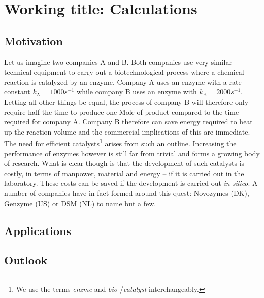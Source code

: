 
\chapter[Working title: Calculations]
{Working title: Calculations\label{ch1}}




\section{Motivation}\label{sec:mot}

Let us imagine two companies A and B.
Both companies use very similar technical equipment to carry out a biotechnological process where a chemical reaction is catalyzed by an enzyme.
Company A uses an enzyme with a rate constant $k_\text{A} = 1000s^{-1}$ while company B uses an enzyme with $k_\text{B} = 2000s^{-1}$.
Letting all other things be equal, the process of company B will therefore only require half the time to produce one Mole of product compared to the time required for company A.
Company B therefore can save energy required to heat up the reaction volume and the commercial implications of this are immediate.
The need for efficient catalysts\footnote{We use the terms \textit{enzme} and \textit{bio-}/\textit{catalyst} interchangeably.} arises from such an outline.
Increasing the performance of enzymes however is still far from trivial and forms a growing body of research.
What is clear though is that the development of such catalysts is costly, in terms of manpower, material and energy -- if it is carried out in the laboratory.
These costs can be saved if the development is carried out \textit{in silico}.
A number of companies have in fact formed around this quest: Novozymes (DK), Genzyme (US) or DSM (NL) to name but a few\citep{meyer2013use}.






\section{Applications}\label{sec:apps}

\section{Outlook}\label{sec:out}
